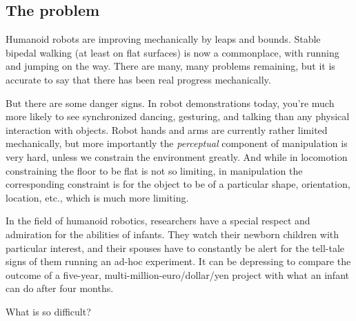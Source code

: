 



\subsection{The problem}

Humanoid robots are improving mechanically by leaps and bounds.
Stable bipedal walking (at least on flat surfaces) is now a
commonplace, with running and jumping on the way.  There are
many, many problems remaining, but it is accurate to say that
there has been real progress mechanically.

But there are some danger signs.  In robot demonstrations today,
you're much more likely to see synchronized dancing, gesturing, and
talking than any physical interaction with objects.  Robot hands and
arms are currently rather limited mechanically, but more importantly
the {\em perceptual} component of manipulation is very hard, unless we
constrain the environment greatly.  And while in locomotion
constraining the floor to be flat is not so limiting, in manipulation
the corresponding constraint is for the object to be of a particular
shape, orientation, location, etc., which is much more limiting.

In the field of humanoid robotics, researchers have a special respect
and admiration for the abilities of infants.  They watch their newborn
children with particular interest, and their spouses have to
constantly be alert for the tell-tale signs of them running an ad-hoc
experiment.  It can be depressing to compare the outcome of a 
five-year, multi-million-euro/dollar/yen project with what an
infant can do after four months.

What is so difficult?  


